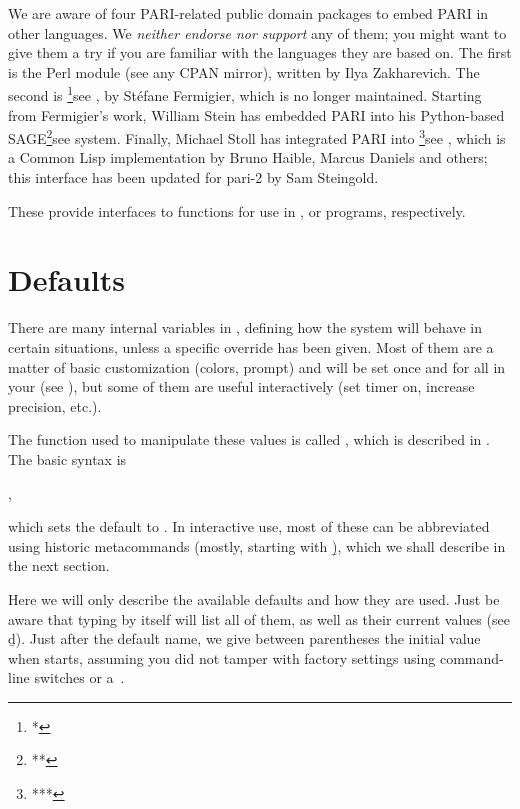 We are aware of four PARI-related public domain packages to embed PARI in
other languages. We \emph{neither endorse nor support} any of them; you might
want to give them a try if you are familiar with the languages they are based
on. The first is the  Perl module (see any CPAN mirror),
written by Ilya Zakharevich. The second is %
\footnote{*}{see },
%
by St\'efane Fermigier, which is no longer maintained. Starting from
Fermigier's work, William Stein has embedded PARI into his Python-based
SAGE\footnote{**}{see }
system. Finally, Michael Stoll has integrated PARI into 
\footnote{***}{see }, which is a Common Lisp
implementation by Bruno Haible, Marcus Daniels and others; this interface has
been updated for pari-2 by Sam Steingold.

These provide interfaces to  functions for use in ,
 or  programs,
respectively.

\section{Defaults}
\label{se:defaults}

\noindent There are many internal variables in , defining how the
system will behave in certain situations, unless a specific override has been
given. Most of them are a matter of basic customization (colors, prompt) and
will be set once and for all in your  (see
), but some of them are useful interactively (set timer on,
increase precision, etc.).

The function used to manipulate these values is called , which
is described in . The basic syntax is

,

\noindent which sets the default  to . In interactive
use, most of these can be abbreviated using historic  metacommands
(mostly, starting with \b), which we shall describe in the next section.

Here we will only describe the available defaults and how they are used. Just
be aware that typing  by itself will list all of them, as well
as their current values (see \b{d}). Just after the default name, we give
between parentheses the initial value when  starts, assuming you did
not tamper with factory settings using command-line switches or a~.

